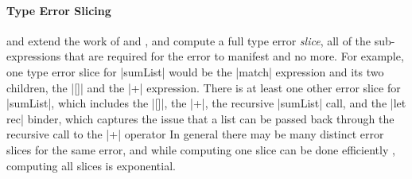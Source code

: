 \paragraph{Type Error Slicing}
\citet{Tip2001-qp} and \citet{Haack2003-vc} extend the work of
\citeauthor{McAdam1998-ub} and \citeauthor{Yang1999-yr}, and compute a
full type error \emph{slice}, \ie all of the sub-expressions that are
required for the error to manifest and no more.
%
For example, one type error slice for |sumList| would be the |match|
expression and its two children, the |[]| and the |+| expression.
%
There is at least one other error slice for |sumList|, which includes
the |[]|, the |+|, the recursive |sumList| call, and the |let rec|
binder, which captures the issue that a list can be passed back through
the recursive call to the |+| operator
%
In general there may be many distinct error slices for the same error,
and while computing one slice can be done efficiently ,
computing all slices is exponential.
%



